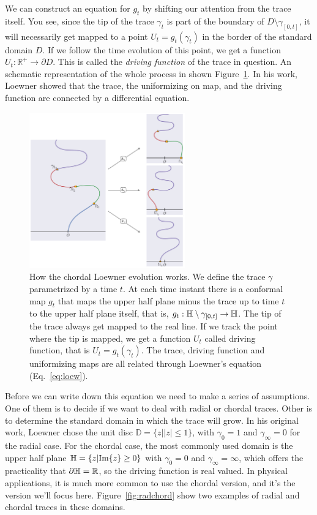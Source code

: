 We can construct an equation for $g_t$ by shifting our attention from the trace
itself. You see, since the tip of the trace $\gamma_t$ is part of the boundary
of $D\setminus\gamma_{[0,t]}$, it will necessarily get mapped to a point
$U_t=g_t(\gamma_t)$ in the border of the standard domain $D$. If we follow the
time evolution of this point, we get a function
$U_t:\mathbb{R}^+\rightarrow\partial D$. This is called the \textit{driving
    function} of the trace in question. An schematic representation of the
whole process in shown Figure~\ref{fig:loewexplain}. In his work, Loewner
showed that the trace, the uniformizing on map, and the driving function are
connected by a differential equation.

\begin{figure}[t]
\begin{center}
    \includegraphics[width=0.6\textwidth]{chapters/ch4-sle/figs/loewexplain}
\end{center}
\caption{How the chordal Loewner evolution works. We define the trace $\gamma$
    parametrized by a time $t$. At each time instant there is a conformal map
    $g_t$ that maps the upper half plane minus the trace up to time $t$ to the
    upper half plane itself, that is, $g_t:\mathbb{H}\setminus\gamma_{[0,t]}
    \rightarrow\mathbb{H}$. The tip of the trace always get mapped to the real line.
    If we track the point where the tip is mapped, we get a function $U_t$
    called driving function, that is $U_t=g_t\left(\gamma_t\right)$.
    The trace, driving function and uniformizing maps are all related through
    Loewner's equation (Eq.~\ref{eq:loew}).}
\label{fig:loewexplain}
\end{figure}

Before we can write down this equation we need to make a series of assumptions.
One of them is to decide if we want to deal with radial or chordal traces.
Other is to determine the standard domain in which the trace will grow. In his
original work, Loewner chose the unit disc $\mathbb{D}=\{z||z|\leq1\}$, with
$\gamma_0=1$ and $\gamma_\infty=0$ for the radial case. For the chordal case,
the most commonly used domain is the upper half plane
$\mathbb{H}=\{z|\mbox{Im}\{z\}\geq0\}$ with $\gamma_0=0$ and $\gamma_\infty=\infty$,
which offers the practicality that $\partial\mathbb{H}=\mathbb{R}$, so the driving
function is real valued. In physical applications, it is much more common to
use the chordal version, and it's the version we'll focus here.
Figure~\ref{fig:radchord} show two examples of radial and chordal traces in
these domains.

